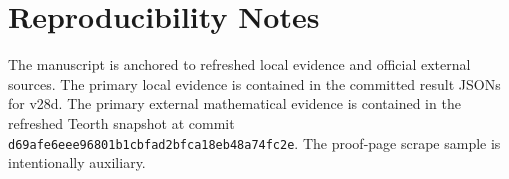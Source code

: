 \documentclass[12pt]{amsart}
\begin{document}
\section{Reproducibility Notes}

The manuscript is anchored to refreshed local evidence and official external sources. The primary local evidence is contained in the committed result JSONs for v28d. The primary external mathematical evidence is contained in the refreshed Teorth snapshot at commit \texttt{d69afe6eee96801b1cbfad2bfca18eb48a74fc2e}. The proof-page scrape sample is intentionally auxiliary.



\end{document}
